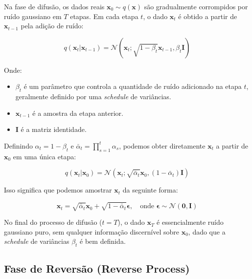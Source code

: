 \documentclass{tufte-handout}
\begin{document}
\begin{defn}
Na fase de difusão, os dados reais $\mathbf{x}_0 \sim q(\mathbf{x})$ são gradualmente corrompidos por ruído gaussiano em $T$ etapas. Em cada etapa $t$, o dado $\mathbf{x}_t$ é obtido a partir de $\mathbf{x}_{t-1}$ pela adição de ruído:

\begin{equation}
    q(\mathbf{x}_t | \mathbf{x}_{t-1}) = \mathcal{N}(\mathbf{x}_t; \sqrt{1 - \beta_t} \mathbf{x}_{t-1}, \beta_t \mathbf{I})
\end{equation}

Onde:
\begin{itemize}
    \item $\beta_t$ é um parâmetro que controla a quantidade de ruído adicionado na etapa $t$, geralmente definido por uma \textit{schedule} de variâncias.
    \item $\mathbf{x}_{t-1}$ é a amostra da etapa anterior.
    \item $\mathbf{I}$ é a matriz identidade.
\end{itemize}

Definindo $\alpha_t = 1 - \beta_t$ e $\bar{\alpha}_t = \prod_{s=1}^t \alpha_s$, podemos obter diretamente $\mathbf{x}_t$ a partir de $\mathbf{x}_0$ em uma única etapa:

\begin{equation}
    q(\mathbf{x}_t | \mathbf{x}_0) = \mathcal{N}(\mathbf{x}_t; \sqrt{\bar{\alpha}_t} \mathbf{x}_0, (1 - \bar{\alpha}_t) \mathbf{I})
\end{equation}

Isso significa que podemos amostrar $\mathbf{x}_t$ da seguinte forma:

\begin{equation}
    \mathbf{x}_t = \sqrt{\bar{\alpha}_t} \mathbf{x}_0 + \sqrt{1 - \bar{\alpha}_t} \boldsymbol{\epsilon}, \quad \text{onde } \boldsymbol{\epsilon} \sim \mathcal{N}(\mathbf{0}, \mathbf{I})
\end{equation}

No final do processo de difusão ($t = T$), o dado $\mathbf{x}_T$ é essencialmente ruído gaussiano puro, sem qualquer informação discernível sobre $\mathbf{x}_0$, dado que a \textit{schedule} de variâncias $\beta_t$ é bem definida.
\end{defn}

\subsection{Fase de Reversão (Reverse Process)}
\end{document}
